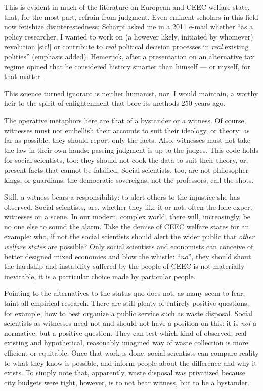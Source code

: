 \documentclass[11pt,a4paper,oneside,openright]{article}
\begin{document}
This is evident in much of the literature on European and \gls{CEEC} welfare state, that, for the most part, refrain from judgment. 
Even eminent scholars in this field now fetishize disinterestedness: 
Scharpf asked me in a 2011 e-mail whether ``as a policy researcher, I wanted to work on (a however likely, initiated by whomever) revolution [sic!] or contribute to \emph{real} political decision processes in \emph{real} existing polities'' (emphasis added). 
Hemerijck, after a presentation on an alternative tax regime opined that he considered history smarter than himself --- or myself, for that matter.

This science turned ignorant is neither humanist, nor, I would maintain, a worthy heir to the spirit of enlightenment that bore its methods 250 years ago.

The operative metaphors here are that of a bystander or a witness. 
Of course, witnesses must not embellish their accounts to suit their ideology, or theory: 
as far as possible, they should report only the facts. 
Also, witnesses must not take the law in their own hands: 
passing judgment is up to the judges. 
This code holds for social scientists, too: 
they should not cook the data to suit their theory, or, present facts that cannot be falsified. 
Social scientists, too, are not philosopher kings, or guardians: 
the democratic sovereigns, not the professors, call the shots.

Still, a witness bears a responsibility: 
to alert others to the injustice she has observed. 
Social scientists, are, whether they like it or not, often the lone expert witnesses on a scene. 
In our modern, complex world, there will, increasingly, be no one else to sound the alarm. 
Take the demise of \gls{CEEC} welfare states for an example: 
who, if not the social scientists should alert the wider public that \emph{other welfare states} are possible? 
Only social scientists and economists can conceive of better designed mixed economies and blow the whistle: 
``\emph{no}'', they should shout, the hardship and instability suffered by the people of \gls{CEEC} is not materially inevitable, it is a particular choice made by particular people. 


Pointing to the alternatives to the status quo does not, as many seem to fear, taint all empirical research. 
There are still plenty of entirely positive questions, for example, how to best organize a public service such as waste disposal. 
Social scientists as witnesses need not and should not have a position on this: 
it is \emph{not} a normative, but a positive question. 
They can test which kind of observed, real existing and hypothetical, reasonably imagined way of waste collection is more efficient or equitable. 
Once that work is done, social scientists can compare reality to what they know is possible, and inform people about the difference and why it exists. 
To simply note that, apparently, waste disposal was privatized because city budgets were tight, however, is to not bear witness, but to be a bystander.
\end{document}
